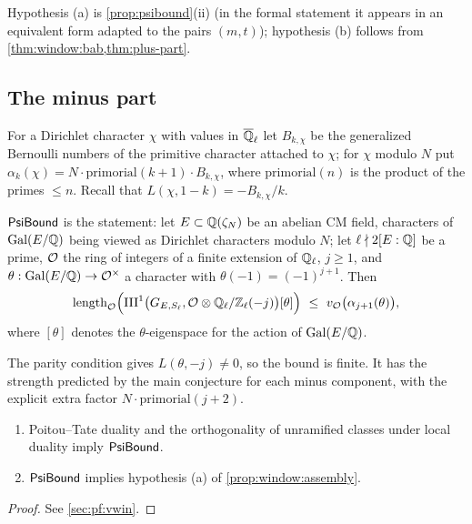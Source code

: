 Hypothesis (a) is \cref{prop:psibound}(ii) (in the formal statement it appears in an equivalent form adapted to
the pairs $(m,t)$); hypothesis (b) follows from \cref{thm:window:bab,thm:plus-part}.

\subsection{The minus part}\label{sec:window:minus}

For a Dirichlet character $\chi$ with values in $\overline{\mathbb{Q}}_\ell$ let $B_{k,\chi}$ be the generalized Bernoulli numbers of
the primitive character attached to $\chi$; for $\chi$ modulo $N$ put
$\alpha_k(\chi)=N\cdot\mathrm{primorial}(k+1)\cdot B_{k,\chi}$, where $\mathrm{primorial}(n)$ is the product of the
primes $\le n$. Recall that $L(\chi,1-k)=-B_{k,\chi}/k$.

\begin{definition}\label{def:window:psibound}
$\mathsf{PsiBound}$ is the statement: let $E\subset\mathbb{Q}(\zeta_N)$ be an abelian CM field, characters of $\operatorname{Gal}(E/\mathbb{Q})$
being viewed as Dirichlet characters modulo $N$; let $\ell\nmid2[E:\mathbb{Q}]$ be a prime, $\mathcal{O}$ the ring of integers of a
finite extension of $\mathbb{Q}_\ell$, $j\ge1$, and $\theta:\operatorname{Gal}(E/\mathbb{Q})\to\mathcal{O}^\times$ a character with $\theta(-1)=(-1)^{j+1}$.
Then
\[
 \len_\OO\Bigl(\Sha^1\bigl(G_{E,S_\ell},\OO\otimes\windowQZ(-j)\bigr)[\theta]\Bigr)\ \le\ v_\OO\bigl(\alpha_{j+1}(\theta)\bigr),
\]
where $[\theta]$ denotes the $\theta$-eigenspace for the action of $\operatorname{Gal}(E/\mathbb{Q})$.
\end{definition}

The parity condition gives $L(\theta,-j)\ne0$, so the bound is finite. It has the strength predicted by the main
conjecture \cite{MazurWiles1984,HuberKings2003} for each minus component, with the explicit extra factor
$N\cdot\mathrm{primorial}(j+2)$.

\begin{proposition}\Fmark\label{prop:psibound}
\begin{enumerate}[label=(\roman*)]
\item Poitou--Tate duality and the orthogonality of unramified classes under local duality imply
  $\mathsf{PsiBound}$.
\item $\mathsf{PsiBound}$ implies hypothesis (a) of \cref{prop:window:assembly}.
\end{enumerate}
\end{proposition}
\begin{proof}See \cref{sec:pf:vwin}.
\end{proof}


